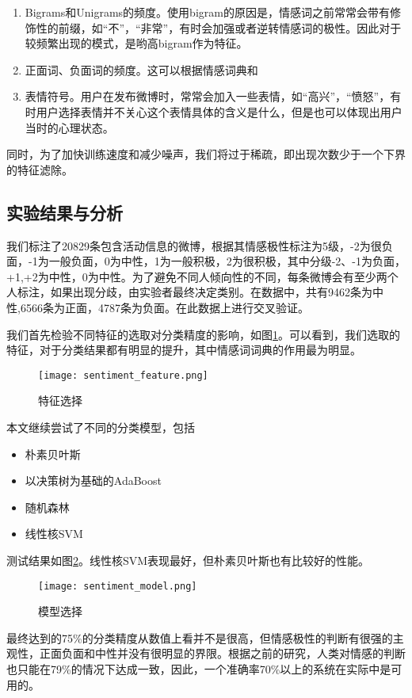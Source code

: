 \begin{enumerate}
\item Bigrams和Unigrams的频度。使用bigram的原因是，情感词之前常常会带有修饰性的前缀，如``不''，``非常''，有时会加强或者逆转情感词的极性。因此对于较频繁出现的模式，是哟高bigram作为特征。
\item 正面词、负面词的频度。这可以根据情感词典和
\item 表情符号。用户在发布微博时，常常会加入一些表情，如``高兴''，``愤怒''，有时用户选择表情并不关心这个表情具体的含义是什么，但是也可以体现出用户当时的心理状态。
\end{enumerate}
同时，为了加快训练速度和减少噪声，我们将过于稀疏，即出现次数少于一个下界的特征滤除。

\subsection{实验结果与分析}

我们标注了20829条包含活动信息的微博，根据其情感极性标注为5级，-2为很负面，-1为一般负面，0为中性，1为一般积极，2为很积极，其中分级-2、-1为负面，+1,+2为中性，0为中性。为了避免不同人倾向性的不同，每条微博会有至少两个人标注，如果出现分歧，由实验者最终决定类别。在数据中，共有9462条为中性,6566条为正面，4787条为负面。在此数据上进行交叉验证。

我们首先检验不同特征的选取对分类精度的影响，如图\ref{fig:sentiment_feature}。可以看到，我们选取的特征，对于分类结果都有明显的提升，其中情感词词典的作用最为明显。
\begin{figure}[!h]
\centering
\texttt{[image: sentiment\_feature.png]}
\caption{特征选择}
\label{fig:sentiment_feature}
\end{figure}

本文继续尝试了不同的分类模型，包括
\begin{itemize}
\item 朴素贝叶斯
\item 以决策树为基础的AdaBoost
\item 随机森林
\item 线性核SVM
\end{itemize}
测试结果如图\ref{fig:sentiment_model}。线性核SVM表现最好，但朴素贝叶斯也有比较好的性能。

\begin{figure}[!h]
\centering
\texttt{[image: sentiment\_model.png]}
\caption{模型选择}
\label{fig:sentiment_model}
\end{figure}

最终达到的75\%的分类精度从数值上看并不是很高，但情感极性的判断有很强的主观性，正面负面和中性并没有很明显的界限。根据之前的研究，人类对情感的判断也只能在79\%的情况下达成一致，因此，一个准确率70\%以上的系统在实际中是可用的。


